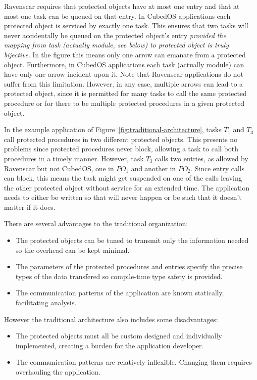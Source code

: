 Ravenscar requires that protected objects have at most one entry and that at most one task can
be queued on that entry. In CubedOS applications each protected object is serviced by exactly
one task. This ensures that two tasks will never accidentally be queued on the protected
object's entry \emph{provided the mapping from task (actually module, see below) to protected
  object is truly bijective}. In the figure this means only one arrow can emanate from a
protected object. Furthermore, in CubedOS applications each task (actually module) can have only
one arrow incident upon it. Note that Ravenscar applications do not suffer from this limitation.
However, in any case, multiple arrows can lead to a protected object, since it is permitted for
many tasks to call the same protected procedure or for there to be multiple protected procedures
in a given protected object.

In the example application of Figure~\ref{fig:traditional-architecture}, tasks $T_1$ and $T_3$
call protected procedures in two different protected objects. This presents no problems since
protected procedures never block, allowing a task to call both procedures in a timely manner.
However, task $T_3$ calls two entries, as allowed by Ravenscar but not CubedOS, one in $PO_1$
and another in $PO_2$. Since entry calls can block, this means the task might get suspended on
one of the calls leaving the other protected object without service for an extended time. The
application needs to either be written so that will never happen or be such that it doesn't
matter if it does.

There are several advantages to the traditional organization:

\begin{itemize}
\item The protected objects can be tuned to transmit only the information needed so the overhead
  can be kept minimal.
\item The parameters of the protected procedures and entries specify the precise types of the
  data transfered so compile-time type safety is provided.
\item The communication patterns of the application are known statically, facilitating analysis.
\end{itemize}

However the traditional architecture also includes some disadvantages:

\begin{itemize}
\item The protected objects must all be custom designed and individually implemented, creating a
  burden for the application developer.
\item The communication patterns are relatively inflexible. Changing them requires overhauling
  the application.
\end{itemize}


